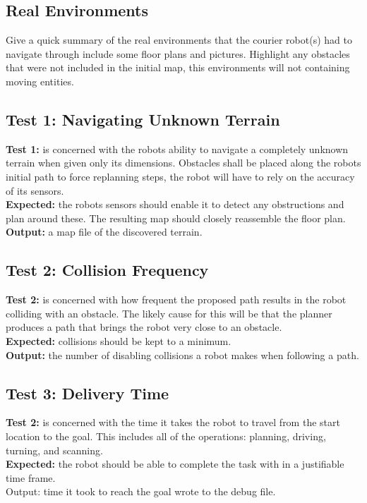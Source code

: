 \subsection{Real Environments}

Give a quick summary of the real environments that the courier robot(s) had to navigate through include some floor plans and pictures. Highlight any obstacles that were not included in the initial map, this environments will not containing moving entities.

\subsection{Test 1: Navigating Unknown Terrain}

\noindent
\textbf{Test 1:} is concerned with the robots ability to navigate a completely unknown terrain when given only its dimensions. Obstacles shall be placed along the robots initial path to force replanning steps, the robot will have to rely on the accuracy of its sensors.\\

\noindent
\textbf{Expected:} the robots sensors should enable it to detect any obstructions and plan around these. The resulting map should closely reassemble the floor plan.\\

\noindent
\textbf{Output:} a map file of the discovered terrain.

\subsection{Test 2: Collision Frequency}

\noindent
\textbf{Test 2:} is concerned with how frequent the proposed path results in the robot colliding with an obstacle. The likely cause for this will be that the planner produces a path that brings the robot very close to an obstacle.\\

\noindent
\textbf{Expected:} collisions should be kept to a minimum.\\

\noindent
\textbf{Output:} the number of disabling collisions a robot makes when following a path.

\subsection{Test 3: Delivery Time}

\noindent
\textbf{Test 2:} is concerned with the time it takes the robot to travel from the start location to the goal. This includes all of the operations: planning, driving, turning, and scanning.\\

\noindent
\textbf{Expected:} the robot should be able to complete the task with in a justifiable time frame.\\

\noindent
Output: time it took to reach the goal wrote to the debug file.
